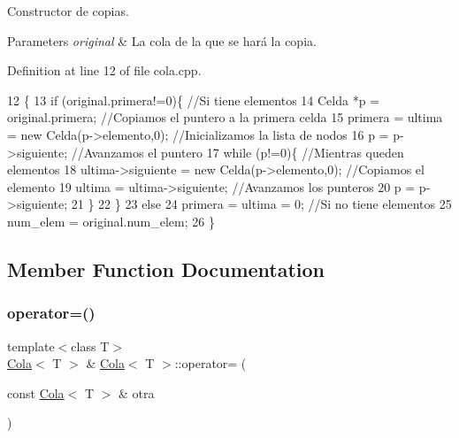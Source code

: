 Constructor de copias. 


\begin{DoxyParams}{Parameters}
{\em original} & La cola de la que se hará la copia. \\
\hline
\end{DoxyParams}


Definition at line 12 of file cola.\+cpp.


\begin{DoxyCode}
12                                      \{
13   \textcolor{keywordflow}{if} (original.primera!=0)\{           \textcolor{comment}{//Si tiene elementos}
14     Celda *p = original.primera;      \textcolor{comment}{//Copiamos el puntero a la primera celda}
15     primera = ultima = \textcolor{keyword}{new} Celda(p->elemento,0); \textcolor{comment}{//Inicializamos la lista de nodos}
16     p = p->siguiente;                     \textcolor{comment}{//Avanzamos el puntero}
17     \textcolor{keywordflow}{while} (p!=0)\{                         \textcolor{comment}{//Mientras queden elementos}
18       ultima->siguiente = \textcolor{keyword}{new} Celda(p->elemento,0); \textcolor{comment}{//Copiamos el elemento}
19       ultima = ultima->siguiente;                   \textcolor{comment}{//Avanzamos los punteros}
20       p = p->siguiente;
21     \}
22   \}
23   \textcolor{keywordflow}{else}
24     primera = ultima = 0;            \textcolor{comment}{//Si no tiene elementos}
25   num\_elem = original.num\_elem;
26 \}
\end{DoxyCode}


\subsection{Member Function Documentation}
\mbox{\label{classCola_a2ac480681dec95b8ffeea075507849e2}} 
\subsubsection{\texorpdfstring{operator=()}{operator=()}}
{\footnotesize\ttfamily template$<$class T$>$ \\
\hyperlink{classCola}{Cola}$<$ T $>$ \& \hyperlink{classCola}{Cola}$<$ T $>$\+::operator= (\begin{DoxyParamCaption}\item[{const \hyperlink{classCola}{Cola}$<$ T $>$ \&}]{otra }\end{DoxyParamCaption})}



